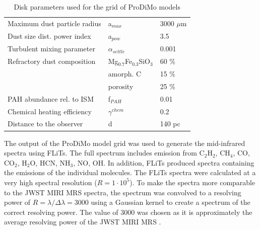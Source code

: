 \documentclass[twoside, single, authoryear, semicolon, 12pt]{lion-msc}
\newcommand{\4}{$_4$}
\newcommand{\3}{$_3$}
\newcommand{\2}{$_2$}
\begin{document}
\begin{table}[H]
\begin{tabular}{@{}lll@{}}
Maximum dust particle radius      & a$_{max}$                   & 3000 $\mu$m                \\
Dust size dist. power index       & a$_{pow}$                   & 3.5                        \\
Turbulent mixing parameter        & $\alpha_{settle}$           & 0.001                      \\
Refractory dust composition       & Mg$_{0.7}$Fe$_{0.3}$SiO\3 & 60 \%                      \\
                                  & amorph. C                   & 15 \%                      \\
                                  & porosity                    & 25 \%                      \\
PAH abundance rel. to ISM         & f$_{PAH}$                   & 0.01                       \\
Chemical heating efficiency       & $\gamma^{chem}$             & 0.2                        \\ \midrule
Distance to the observer          & d                           & 140 pc                     \\ \bottomrule
\end{tabular}
\caption{Disk parameters used for the grid of ProDiMo models}
\label{tab: parameters}
\end{table}


The output of the ProDiMo model grid was used to generate the mid-infrared spectra using FLiTs. The full spectrum includes emission from C\2H\2, CH\4, CO, CO\2, H\2O, HCN, NH\3, NO, OH. In addition, FLiTs produced spectra containing the emissions of the individual molecules. The FLiTs spectra were calculated at a very high spectral resolution ($R=1\cdot10^5$). To make the spectra more comparable to the JWST MIRI MRS spectra, the spectrum was convolved to a resolving power of $R = \lambda/\Delta\lambda = 3000$ using a Gaussian kernel to create a spectrum of the correct resolving power. The value of 3000 was chosen as it is approximately the average resolving power of the JWST MIRI MRS \citep{Argyriou_2023}. 
\end{document}
